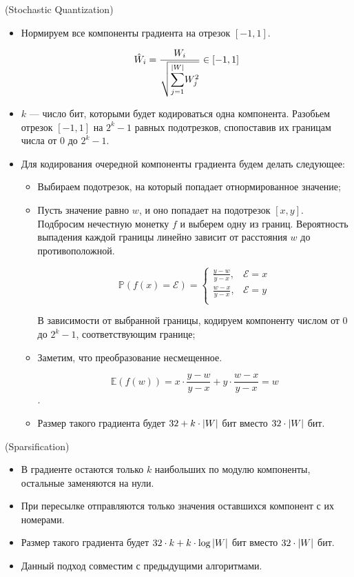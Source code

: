 \begin{algorithm}(Stochastic Quantization)
  \begin{itemize}
    \item Нормируем все компоненты градиента на отрезок $[-1, 1]$.

      $$\hat{W}_i
        = \frac{W_i}{\sqrt{\mathlarger{\sum_{j = 1}^{\abs{W}}}W_j^2}}
        \in [-1, 1]$$
    \item $k$ --- число бит, которыми будет кодироваться одна компонента.
      Разобьем отрезок $[-1, 1]$ на $2^k - 1$ равных подотрезков, спопоставив
      их границам числа от $0$ до $2^k - 1$.
    \item Для кодирования очередной компоненты градиента будем делать следующее:
      \begin{itemize}
        \item Выбираем подотрезок, на который попадает отнормированное значение;
        \item Пусть значение равно $w$, и оно попадает на подотрезок $[x, y]$.
          Подбросим нечестную монетку $f$ и выберем одну из границ. Вероятность
          выпадения каждой границы линейно зависит от расстояния $w$ до
          противоположной.

          $$\mathbb{P}(f(x) = \mathcal{E}) =
            \begin{cases}
              \frac{y - w}{y - x}, & \mathcal{E} = x \\
              \frac{w - x}{y - x}, & \mathcal{E} = y \\
            \end{cases}$$

          В зависимости от выбранной границы, кодируем компоненту числом от $0$
          до $2^k - 1$, соответствующим границе;
        \item Заметим, что преобразование несмещенное.

          $$\mathbb{E}(f(w)) = x \cdot \frac{y - w}{y - x} + y \cdot
            \frac{w - x}{y - x} = w$$.
        \item Размер такого градиента будет $32 + k \cdot \lvert W\rvert$ бит вместо
          $32 \cdot \lvert W\rvert$ бит.
      \end{itemize}
  \end{itemize}
\end{algorithm}

\begin{algorithm}(Sparsification)
  \begin{itemize}
    \item В градиенте остаются только $k$ наибольших по модулю компоненты,
      остальные заменяются на нули.
    \item При пересылке отправляются только значения оставшихся компонент с
      их номерами.
    \item Размер такого градиента будет $32 \cdot k  + k \cdot \log{\lvert W\rvert}$
      бит вместо $32 \cdot \lvert W\rvert$ бит.
    \item Данный подход совместим с предыдущими алгоритмами.
  \end{itemize}
\end{algorithm}

